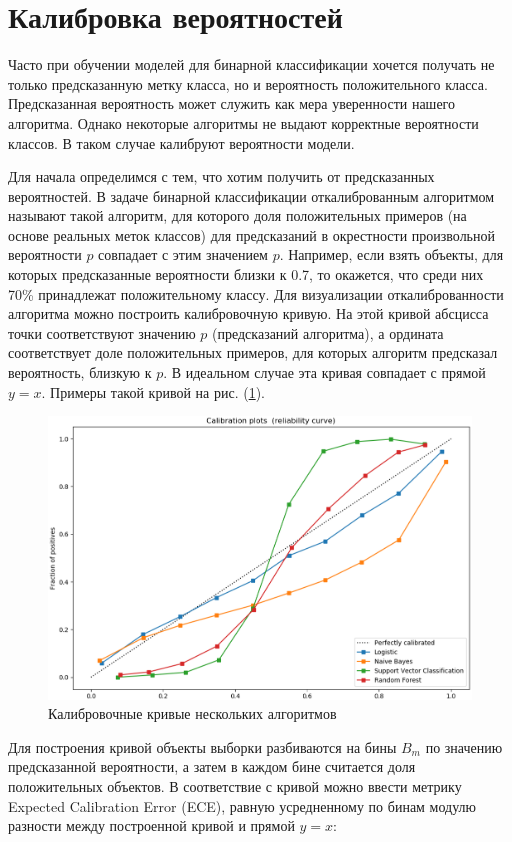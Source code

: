 \documentclass[12pt,a4paper]{article}
\begin{document}
\section{Калибровка вероятностей}

Часто при обучении моделей для бинарной классификации хочется получать не только предсказанную метку класса, но и вероятность положительного класса. Предсказанная вероятность может служить как мера уверенности нашего алгоритма. Однако некоторые алгоритмы не выдают корректные вероятности классов. В таком случае калибруют вероятности модели.

Для начала определимся с тем, что хотим получить от предсказанных вероятностей. В задаче бинарной классификации откалиброванным алгоритмом называют такой алгоритм, для которого доля положительных примеров (на основе реальных меток классов) для предсказаний в окрестности произвольной вероятности $p$ совпадает с этим значением $p$. Например, если взять объекты, для которых предсказанные вероятности близки к 0.7, то окажется, что среди них 70\% принадлежат положительному классу. Для визуализации откалиброванности алгоритма можно построить калибровочную кривую. На этой кривой абсцисса точки соответствуют значению $p$ (предсказаний алгоритма), а ордината соответствует доле положительных примеров, для которых алгоритм предсказал вероятность, близкую к $p$. В идеальном случае эта кривая совпадает с прямой $y = x$. Примеры такой кривой на рис. (\ref{fig:plot}).

\begin{center}
\begin{figure}[!htb]
 \centering
 \includegraphics[width=0.7\linewidth]{img/calibration_plot.eps}
 \caption{Калибровочные кривые нескольких алгоритмов}\label{fig:plot}
\end{figure}
\end{center}

Для построения кривой объекты выборки разбиваются на бины $B_m$ по значению предсказанной вероятности, а затем в каждом бине считается доля положительных объектов. В соответствие с кривой можно ввести метрику Expected Calibration Error (ECE), равную усредненному по бинам модулю разности между построенной кривой и прямой $y = x$:
\end{document}
